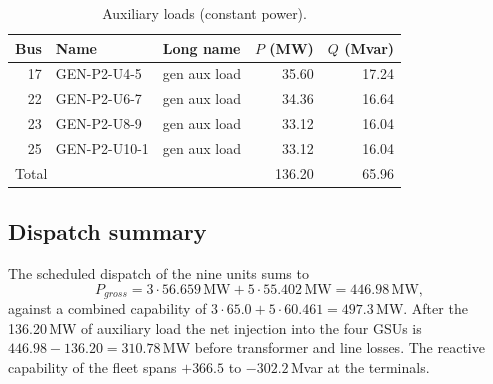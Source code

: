 \begin{table}[!ht]
\centering
\begin{tabularx}{\linewidth}{@{}r l X r r@{}}
\toprule
\multicolumn{1}{c}{\textbf{Bus}} & \textbf{Name} & \textbf{Long name} & \multicolumn{1}{c}{\textbf{$P$ (MW)}} & \multicolumn{1}{c}{\textbf{$Q$ (Mvar)}} \\
\midrule
17 & GEN-P2-U4-5  & gen aux load & 35.60 & 17.24 \\
22 & GEN-P2-U6-7  & gen aux load & 34.36 & 16.64 \\
23 & GEN-P2-U8-9  & gen aux load & 33.12 & 16.04 \\
25 & GEN-P2-U10-1 & gen aux load & 33.12 & 16.04 \\
\midrule
\multicolumn{3}{l}{Total} & 136.20 & 65.96 \\
\bottomrule
\end{tabularx}
\caption{Auxiliary loads (constant power).}
\label{tab:load}
\end{table}

\subsection{Dispatch summary}

The scheduled dispatch of the nine units sums to
\begin{equation}
  P_{gross} = 3 \cdot 56.659\,\mathrm{MW} + 5 \cdot 55.402\,\mathrm{MW} = 446.98\,\mathrm{MW},
\end{equation}
against a combined capability of $3 \cdot 65.0 + 5 \cdot 60.461 = 497.3$\,MW. After
the 136.20\,MW of auxiliary load the net injection into the four GSUs is
$446.98 - 136.20 = 310.78$\,MW before transformer and line losses. The reactive
capability of the fleet spans $+366.5$ to $-302.2$\,Mvar at the terminals.
